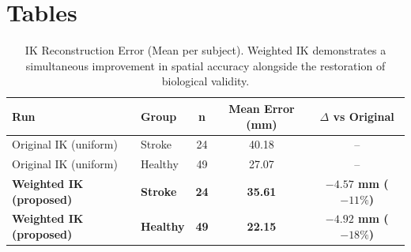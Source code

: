 \documentclass[12pt, a4paper]{article}
\begin{document}
\clearpage
\section*{Tables}

\begin{table}[h]
  \centering
  \caption{IK Reconstruction Error (Mean per subject). Weighted IK demonstrates a simultaneous improvement in spatial accuracy alongside the restoration of biological validity.}
  \vspace{0.5em}
  \begin{tabular}{llccc}
    \toprule
    \textbf{Run} & \textbf{Group} & \textbf{n} & \textbf{Mean Error (mm)} & \textbf{$\Delta$ vs Original} \\
    \midrule
    Original IK (uniform) & Stroke & 24 & 40.18 & -- \\
    Original IK (uniform) & Healthy & 49 & 27.07 & -- \\
    \textbf{Weighted IK (proposed)} & \textbf{Stroke} & \textbf{24} & \textbf{35.61} & \textbf{$-4.57$ mm ($-11\%$)} \\
    \textbf{Weighted IK (proposed)} & \textbf{Healthy} & \textbf{49} & \textbf{22.15} & \textbf{$-4.92$ mm ($-18\%$)} \\
    \bottomrule
  \end{tabular}
\end{table}
\end{document}
